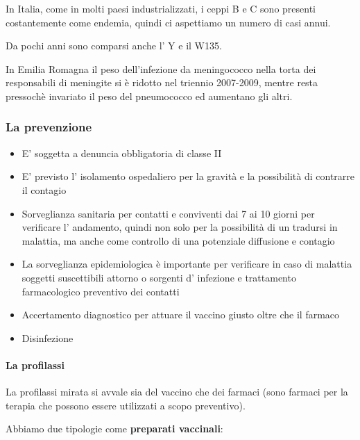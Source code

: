   In Italia, come in molti paesi industrializzati, i ceppi B e C sono
  presenti costantemente come endemia, quindi ci aspettiamo un numero di
  casi annui.

  Da pochi anni sono comparsi anche l' Y e il W135.

  In Emilia Romagna il peso dell'infezione da meningococco nella torta
  dei responsabili di meningite si è ridotto nel triennio 2007-2009,
  mentre resta pressochè invariato il peso del pneumococco ed aumentano
  gli altri.

\subsubsection{La prevenzione}

\begin{itemize}
\item
  E' soggetta a denuncia obbligatoria di classe II
\item
  E' previsto l' isolamento ospedaliero per la gravità e la possibilità
  di contrarre il contagio
\item
  Sorveglianza sanitaria per contatti e conviventi dai 7 ai 10 giorni
  per verificare l' andamento, quindi non solo per la possibilità di un
  tradursi in malattia, ma anche come controllo di una potenziale
  diffusione e contagio
\item
  La sorveglianza epidemiologica è importante per verificare in caso di
  malattia soggetti suscettibili attorno o sorgenti d' infezione e
  trattamento farmacologico preventivo dei contatti
\item
  Accertamento diagnostico per attuare il vaccino giusto oltre che il
  farmaco
\item
  Disinfezione
\end{itemize}

\paragraph{La profilassi}
  La profilassi mirata si avvale sia del vaccino che dei farmaci (sono
  farmaci per la terapia che possono essere utilizzati a scopo
  preventivo).

  Abbiamo due tipologie come \textbf{preparati vaccinali}:

